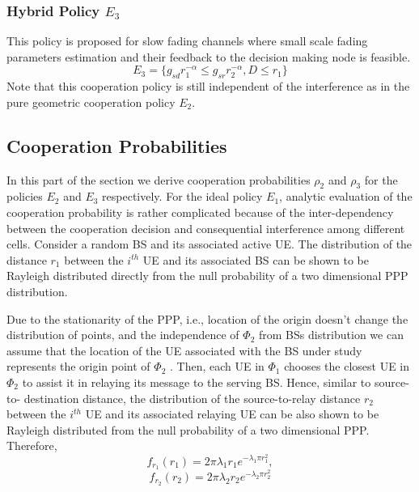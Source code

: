 \subsubsection{Hybrid Policy $E_3$}
This policy is proposed for slow fading channels where small scale fading parameters estimation and their
feedback to the decision making node is feasible. 
\begin{equation}
E_3 = \{g_{sd}r_1^{-\alpha} \leq g_{sr}r_2^{-\alpha}, D \leq r_1 \}
\end{equation}
Note that this cooperation policy is still independent of the
interference as in the pure geometric cooperation policy $E_2$.

\subsection{Cooperation Probabilities}
In this part of the section we derive cooperation probabilities $\rho_2$ and $\rho_3$ for the policies $E_2$ and $E_3$ respectively. For the ideal policy $E_1$, analytic evaluation of the
cooperation probability is rather complicated because of the
inter-dependency between the cooperation decision and consequential interference among different cells. Consider a random BS and its associated active UE. 
The distribution of the distance
$r_1$ between the $i^{th}$ UE and its associated BS can be shown to
be Rayleigh distributed directly from the null probability of a
two dimensional PPP distribution. 
\par  Due to the stationarity of the
PPP, i.e., location of the origin doesn't change the distribution of points, and the independence of $\Phi_2$ from BSs distribution we can assume that
the location of the UE associated with the BS under study
represents the origin point of $\Phi_2$ . Then, each UE
in $\Phi_1$ chooses the closest UE in $\Phi_2$ to assist it in relaying
its message to the serving BS. Hence, similar to source-to-
destination distance, the distribution of the source-to-relay
distance $r_2$ between the $i^{th}$ UE and its associated relaying UE
can be also shown to be Rayleigh distributed from the null probability of a two dimensional PPP. Therefore,
\begin{equation*}
f_{r_1}(r_1) = 2\pi\lambda_1r_1e^{-\lambda_1\pi r_1^2},
\end{equation*}
\begin{equation}
f_{r_2}(r_2) = 2\pi\lambda_2r_2e^{-\lambda_2\pi r_2^2}
\end{equation}

